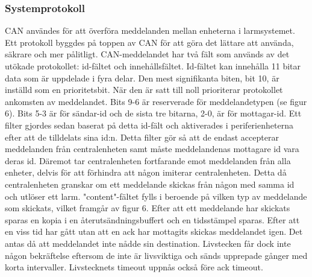 \documentclass{article}
\begin{document}
\subsubsection{Systemprotokoll}
CAN användes för att överföra meddelanden mellan enheterna i larmsystemet. Ett protokoll byggdes på toppen av CAN för att göra det lättare att använda, säkrare och mer pålitligt. CAN-meddelandet har två fält som används av det utökade protokollet: id-fältet och innehållsfältet. Id-fältet kan innehålla 11 bitar data som är uppdelade i fyra delar. Den mest signifikanta biten, bit 10, är inställd som en prioritetsbit. När den är satt till noll prioriterar protokollet ankomsten av meddelandet. Bits 9-6 är reserverade för meddelandetypen (se figur 6). Bits 5-3 är för sändar-id och de sista tre bitarna, 2-0, är för mottagar-id. Ett filter gjordes sedan baserat på detta id-fält och aktiverades i periferienheterna efter att de tilldelats sina id:n. Detta filter gör så att de endast accepterar meddelanden från centralenheten samt måste meddelandenas mottagare id vara deras id. Däremot tar centralenheten fortfarande emot meddelanden från alla enheter, delvis för att förhindra att någon imiterar centralenheten. Detta då centralenheten granskar om ett meddelande skickas från någon med samma id och utlöser ett larm. "content"-fältet fylls i beroende på vilken typ av meddelande som skickats, vilket framgår av figur 6. Efter att ett meddelande har skickats sparas en kopia i en återutsändningsbuffert och en tidsstämpel sparas. Efter att en viss tid har gått utan att en ack har mottagits skickas meddelandet igen. Det antas då att meddelandet inte nådde sin destination. Livstecken får dock inte någon bekräftelse eftersom de inte är livsviktiga och sänds upprepade gånger med korta intervaller. Livstecknets timeout uppnås också före ack timeout.
\end{document}
